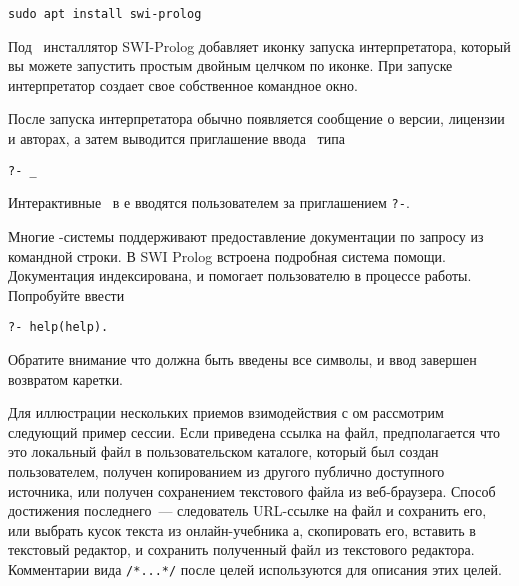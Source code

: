 \begin{verbatim}
sudo apt install swi-prolog
\end{verbatim}

\bigskip
Под \win\ инсталлятор SWI-Prolog добавляет иконку запуска
интерпретатора, который вы можете запустить простым двойным целчком по
иконке. При запуске интерпретатор создает свое собственное командное окно.
\bigskip

После запуска интерпретатора обычно появляется сообщение о версии, лицензии и
авторах, а затем выводится приглашение ввода \ типа

\begin{verbatim}
?- _
\end{verbatim}

Интерактивные \ в \prolog е вводятся пользователем за приглашением
\verb|?-|.

Многие \prolog-системы поддерживают предоставление документации по запросу из
командной строки. В SWI Prolog встроена подробная система помощи. Документация
индексирована, и помогает пользователю в процессе работы. Попробуйте ввести

\begin{verbatim}
?- help(help).
\end{verbatim}

Обратите внимание что должна быть введены все символы, и ввод завершен возвратом
каретки.

Для иллюстрации нескольких приемов взимодействия с \prolog ом рассмотрим
следующий пример сессии. Если приведена ссылка на файл, предполагается что это
локальный файл в пользовательском каталоге, который был создан пользователем,
получен копированием из другого публично доступного источника, или получен
сохранением текстового файла из веб-браузера. Способ достижения последнего\ ---
следователь URL-ссылке на файл и сохранить его, или выбрать кусок текста из
онлайн-учебника \prolog а, скопировать его, вставить в текстовый редактор, и
сохранить полученный файл из текстового редактора. Комментарии вида
\verb|/*...*/| после целей используются для описания этих целей.


